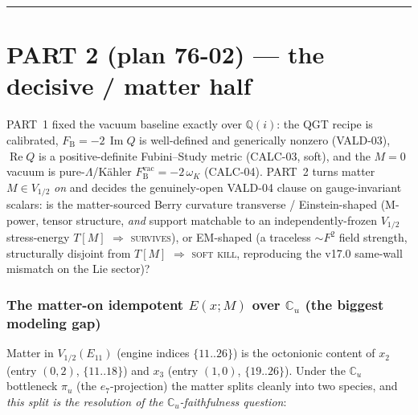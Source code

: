\documentclass[11pt]{article}
\renewcommand{\Re}{\operatorname{Re}}
\renewcommand{\Im}{\operatorname{Im}}
\newcommand{\Cu}{\mathbb{C}_u}
\newcommand{\FB}{F_{\mathrm{B}}}
\theoremstyle{plain}
\theoremstyle{definition}
\begin{document}
\bigskip
\begin{center}\rule{0.6\textwidth}{0.4pt}\end{center}
\bigskip

\part*{PART 2 (plan 76-02) --- the decisive / matter half}

\renewcommand{\thesection}{B.\arabic{section}}
\setcounter{section}{0}
\renewcommand{\theproposition}{B.\arabic{proposition}}
\renewcommand{\thelemma}{B.\arabic{lemma}}
\renewcommand{\theremark}{B.\arabic{remark}}

PART~1 fixed the vacuum baseline exactly over $\mathbb{Q}(i)$: the QGT recipe is
calibrated, $\FB=-2\,\Im Q$ is well-defined and generically nonzero (VALD-03), $\Re Q$
is a positive-definite Fubini--Study metric (CALC-03, soft), and the $M=0$ vacuum is
pure-$\Lambda$/K\"ahler $\FB^{\mathrm{vac}}=-2\,\omega_K$ (CALC-04). PART~2 turns matter
$M\in V_{1/2}$ \emph{on} and decides the genuinely-open VALD-04 clause on
gauge-invariant scalars: is the matter-sourced Berry curvature transverse /
Einstein-shaped (M-power, tensor structure, \emph{and} support matchable to an
independently-frozen $V_{1/2}$ stress-energy $T[M]$ $\Rightarrow$ \textsc{survives}),
or EM-shaped (a traceless $\sim F^2$ field strength, structurally disjoint from $T[M]$
$\Rightarrow$ \textsc{soft kill}, reproducing the v17.0 same-wall mismatch on the Lie
sector)?

\section{The matter-on idempotent $E(x;M)$ over $\Cu$ (the biggest modeling gap)}
\label{sec:matter-idempotent}

Matter in $V_{1/2}(E_{11})$ (engine indices $\{11..26\}$) is the octonionic content of
$x_2$ (entry $(0,2)$, $\{11..18\}$) and $x_3$ (entry $(1,0)$, $\{19..26\}$). Under the
$\Cu$ bottleneck $\pi_u$ (the $e_7$-projection) the matter splits cleanly into two
species, and \emph{this split is the resolution of the $\Cu$-faithfulness question}:
\end{document}
